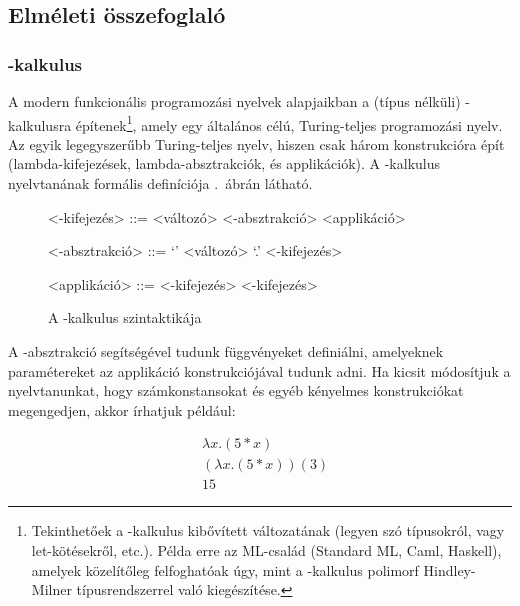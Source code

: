 \documentclass[a4paper,oneside,12pt]{article}
\begin{document}
\subsection{Elméleti összefoglaló}

\subsubsection{\texorpdfstring{\lam}{lambda}-kalkulus}
A modern funkcionális programozási nyelvek alapjaikban a (típus nélküli) \lam-kalkulusra építenek\footnote{Tekinthetőek a \lam-kalkulus kibővített változatának (legyen szó típusokról, vagy \textsf{let}-kötésekről, etc.). Példa erre az ML-család (Standard ML, Caml, Haskell), amelyek közelítőleg felfoghatóak úgy, mint a \lam-kalkulus polimorf Hindley-Milner típusrendszerrel való kiegészítése.}, amely egy általános célú, Turing-teljes programozási nyelv. Az egyik legegyszerűbb Turing-teljes nyelv, hiszen csak három konstrukcióra épít (lambda-kifejezések, lambda-absztrakciók, és applikációk). A \lam-kalkulus nyelvtanának formális definíciója .~ábrán látható.

\begin{figure}[htbp]
  \centering
  \begin{minipage}{7.5cm}
    \setlength{\grammarindent}{9em}

    \begin{grammar}
      <\lam-kifejezés> ::= <változó>
      \alt <\lam-absztrakció>
      \alt <applikáció>

      <\lam-absztrakció> ::= `\lam' <változó> `.' <\lam-kifejezés>

      <applikáció> ::= <\lam-kifejezés> <\lam-kifejezés>
    \end{grammar}
  \end{minipage}
  \caption{A \lam-kalkulus szintaktikája}
  \label{fig:lambda-grammar}
\end{figure}

A \lam-absztrakció segítségével tudunk függvényeket definiálni, amelyeknek paramétereket az applikáció konstrukciójával tudunk adni. Ha kicsit módosítjuk a nyelvtanunkat, hogy számkonstansokat és egyéb kényelmes konstrukciókat megengedjen, akkor írhatjuk például:

\[
  \begin{aligned}
     & \lambda x.(5*x)      \\
     & (\lambda x.(5*x))(3) \\
     & 15
  \end{aligned}
\]
\end{document}
